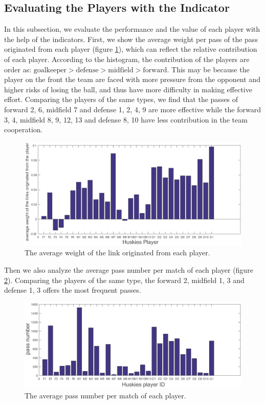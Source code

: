 \documentclass[12pt]{article}
\begin{document}
\subsection{Evaluating the Players with the Indicator}
In this subsection, we evaluate the performance and the value of each player with the help of the indicators. First, we show the average weight per pass of the pass originated from each player (figure \ref{PlayerContribution}), which can reflect the relative contribution of each player. According to the histogram, the contribution of the players are order as: $\text{goalkeeper}>\text{defense}>\text{midfield}>\text{forward}$. This may be because the player on the front the team are faced with more pressure from the opponent and higher risks of losing the ball, and thus have more difficulty in making effective effort. Comparing the players of the same types, we find that the passes of forward 2, 6, midfield 7 and defense 1, 2, 4, 9 are more effective while the forward 3, 4, midfield 8, 9, 12, 13 and defense 8, 10 have less contribution in the team cooperation.
\begin{figure}[h]
	\centering
	\includegraphics[width=.8\textwidth]{PlayerContribution.eps}
	\caption{The average weight of the link originated from each player.}
	\label{PlayerContribution}
\end{figure}

Then we also analyze the average pass number per match of each player (figure \ref{PlayerPassNumber}). Comparing the players of the same type, the forward 2, midfield 1, 3 and defense 1, 3 offers the most frequent passes.
\begin{figure}[h]
	\centering
	\includegraphics[width=.9\textwidth]{PlayerPassNumber.eps}
	\caption{The average pass number per match of each player.}
	\label{PlayerPassNumber}
\end{figure}
\end{document}
